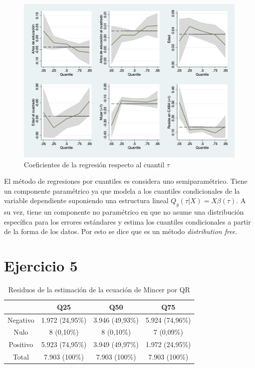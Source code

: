 \documentclass[11pt]{article}
\begin{document}
\begin{figure}[H]
	\caption{Coeficientes de la regresión respecto al cuantil $\tau$}
	\centering
	\includegraphics[width=0.8\linewidth]{4.png}
\end{figure}

El método de regresiones por cuantiles es considera uno semiparamétrico. Tiene un componente paramétrico ya que modela a los cuantiles condicionales de la variable dependiente suponiendo una estructura lineal $Q_y(\tau | X ) = X \beta(\tau)$. A su vez, tiene un componente no paramétrico en que no asume una distribución específica para los errores estándares y estima los cuantiles condicionales a partir de la forma de los datos. Por esto se dice que es un método \textit{distribution free}.

\section*{Ejercicio 5}

\begin{table}
    \centering
    \begin{tabular}{|c|c|c|c|}
    \hline
         & \textbf{Q25} & \textbf{Q50} & \textbf{Q75}\\ \hline
    Negativo & 1.972 (24,95\%) & 3.946 (49,93\%) & 5.924 (74,96\%) \\
    Nulo     & 8 (0,10\%) & 8 (0,10\%) & 7 (0,09\%) \\
    Positivo & 5.923 (74,95\%) & 3.949 (49,97\%) & 1.972 (24,95\%) \\ \hline
    Total    & 7.903 (100\%) & 7.903 (100\%) & 7.903 (100\%) \\ \hline
    \end{tabular}
    \caption{Residuos de la estimación de la ecuación de Mincer por QR}
    \label{tab:residuos_QR}
\end{table}
\end{document}
